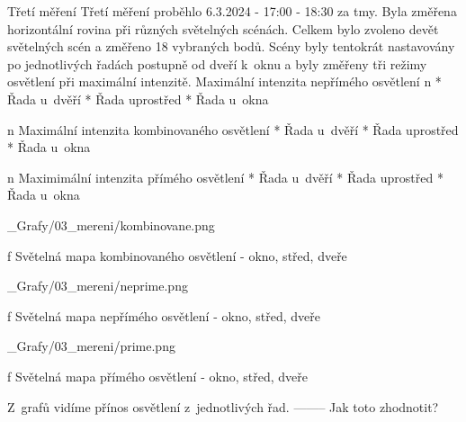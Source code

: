\sec Třetí měření
Třetí měření proběhlo 6.3.2024 - 17:00 - 18:30 za tmy. Byla změřena horizontální rovina při různých světelných scénách.
Celkem bylo zvoleno devět světelných scén a změřeno 18 vybraných bodů. Scény byly tentokrát nastavovány po jednotlivých
řadách postupně od dveří k~oknu a byly změřeny tři režimy osvětlení při maximální intenzitě.
\medskip
{\sbf Maximální intenzita nepřímého osvětlení}
\medskip
\begitems \style n
    * Řada u~dvěří
    \medskip
    * Řada uprostřed
    \medskip
    * Řada u~okna
\enditems

\medskip
\begitems \style n
{\sbf Maximální intenzita kombinovaného osvětlení}
\medskip
    * Řada u~dvěří
    \medskip
    * Řada uprostřed
    \medskip
    * Řada u~okna
\enditems
\medskip

\begitems \style n
{\sbf Maximimální intenzita přímého osvětlení}
\medskip
    * Řada u~dvěří
    \medskip
    * Řada uprostřed
    \medskip
    * Řada u~okna
\enditems

\medskip {}
\picw=18cm _Grafy/03_mereni/kombinovane.png
\caption/f Světelná mapa kombinovaného osvětlení - okno, střed, dveře
\medskip

\medskip {}
\picw=18cm _Grafy/03_mereni/neprime.png
\caption/f Světelná mapa nepřímého osvětlení - okno, střed, dveře
\medskip

\medskip {}
\picw=18cm _Grafy/03_mereni/prime.png
\caption/f Světelná mapa přímého osvětlení - okno, střed, dveře
\medskip

Z~grafů vidíme přínos osvětlení z~jednotlivých řad. -------- Jak toto zhodnotit?